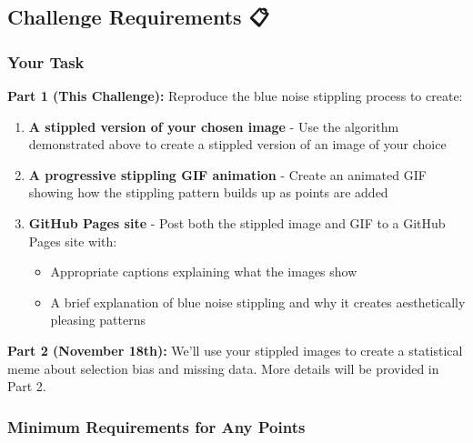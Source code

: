 \documentclass[
  letterpaper,
  DIV=11,
  numbers=noendperiod]{scrartcl}
\providecommand{\tightlist}{%
  \setlength{\itemsep}{0pt}\setlength{\parskip}{0pt}}
\begin{document}
\subsection{Challenge Requirements 📋}\label{challenge-requirements-1}

\subsubsection{Your Task}\label{your-task}

\textbf{Part 1 (This Challenge):} Reproduce the blue noise stippling
process to create:

\begin{enumerate}
\def\labelenumi{\arabic{enumi}.}
\tightlist
\item
  \textbf{A stippled version of your chosen image} - Use the algorithm
  demonstrated above to create a stippled version of an image of your
  choice
\item
  \textbf{A progressive stippling GIF animation} - Create an animated
  GIF showing how the stippling pattern builds up as points are added
\item
  \textbf{GitHub Pages site} - Post both the stippled image and GIF to a
  GitHub Pages site with:

  \begin{itemize}
  \tightlist
  \item
    Appropriate captions explaining what the images show
  \item
    A brief explanation of blue noise stippling and why it creates
    aesthetically pleasing patterns
  \end{itemize}
\end{enumerate}

\textbf{Part 2 (November 18th):} We'll use your stippled images to
create a statistical meme about selection bias and missing data. More
details will be provided in Part 2.

\subsubsection{Minimum Requirements for Any
Points}\label{minimum-requirements-for-any-points}
\end{document}
